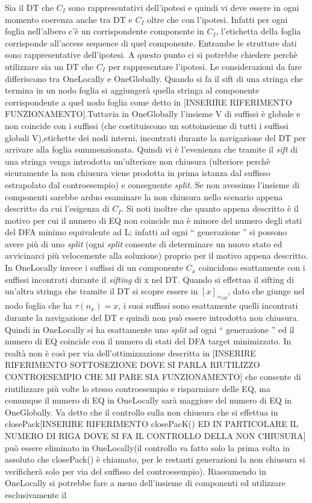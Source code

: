 Sia il \ac{DT} che $C_I$ sono rappresentativi dell'ipotesi e quindi vi deve essere in ogni momento coerenza anche tra \ac{DT} e $C_I$ oltre che con l'ipotesi. Infatti per ogni foglia nell'albero c'è un corrispondente componente  in $C_I$, l'etichetta della foglia corrisponde all'access sequence di quel componente. Entrambe le strutture dati sono rappresentative dell'ipotesi.
A questo punto ci si potrebbe chiedere perchè utilizzare sia un \ac{DT} che $C_I$ per rappresentare l'ipotesi. Le considerazioni da fare differiscono tra OneLocally e OneGlobally. Quando si fa il sift di una stringa che termina in un nodo foglia si aggiungerà quella stringa al componente corrispondente a quel nodo foglia come detto in [INSERIRE RIFERIMENTO FUNZIONAMENTO].Tuttavia in OneGlobally l'insieme V di suffissi è globale e non coincide con i suffissi (che costituiscono un sottoinsieme di tutti i suffissi globali V),etichette dei nodi interni, incontrati durante la navigazione del \ac{DT} per arrivare alla foglia summenzionata. Quindi vi è l'evenienza che tramite il \textit{sift} di una stringa venga introdotta un'ulteriore non chiusura (ulteriore perchè sicuramente la non chiusura viene prodotta in prima istanza dal suffisso estrapolato dal controesempio) e conseguente \textit{split}. Se non avessimo l'insieme di componenti sarebbe arduo esaminare la non chiusura nello scenario appena descritto da cui l'esigenza di $C_I$. Si noti inoltre che quanto appena descritto è il motivo per cui il numero di \ac{EQ} non coincide ma è minore del numero degli stati del \ac{DFA}  minimo equivalente ad \ac{L}; infatti ad ogni `` generazione  '' si possono avere più di uno \textit{split} (ogni \textit{split} consente di determinare un nuovo stato ed avvicinarci più velocemente alla soluzione) proprio per il motivo appena descritto. In OneLocally invece i suffissi di un componente $C_{x}$ coincidono esattamente con i suffissi incontrati durante il \textit{sifting} di x nel \ac{DT}. Quando si effettua il sifting di un'altra stringa che tramite il \ac{DT} si scopre essere in $[x]_{\simeq_{OT}}$, dato che giunge nel nodo foglia che ha $\tau(n_{x}) = x$, i suoi suffissi sono esattamente quelli incontrati durante la navigazione del \ac{DT} e quindi non può essere introdotta non chiusura. Quindi in OneLocally si ha esattamente uno \textit{split} ad ogni `` generazione  '' ed il numero di \ac{EQ} coincide con il numero di stati del DFA target minimizzato. In realtà non è così per via dell'ottimizzazione descritta in [INSERIRE RIFERIMENTO SOTTOSEZIONE DOVE SI PARLA RIUTILIZZO CONTROESEMPIO CHE MI PARE SIA FUNZIONAMENTO] che consente di riutilizzare più volte lo stesso controesempio e risparmiare delle \ac{EQ}, ma comunque il numero di \ac{EQ} in OneLocally sarà maggiore del numero di \ac{EQ} in OneGlobally. Va detto che il controllo sulla non chiusura che si effettua in closePack[INSERIRE RIFERIMENTO closePacK() ED IN PARTICOLARE IL NUMERO DI RIGA DOVE SI FA IL CONTROLLO DELLA NON CHIUSURA] può essere eliminato in OneLocally(il controllo va fatto solo la prima volta in assoluto che closePack() è chiamato, per le restanti generazioni la non chiusura si verificherà solo per via del suffisso del controesempio). Riassumendo in OneLocally si potrebbe fare a meno dell'insieme di componenti ed utilizzare esclusivamente il 